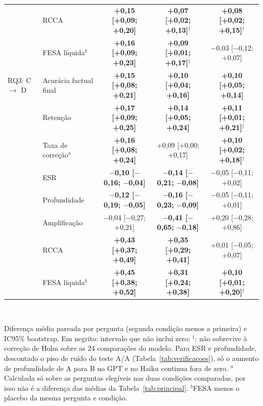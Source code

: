 \begin{table}[t]
\begin{tabular}{|l|l|c|c|c|}
 & RCCA & \textbf{+0,15 [+0,09; +0,20]} & \textbf{+0,07 [+0,02; +0,13]}$^{\dagger}$ & \textbf{+0,08 [+0,02; +0,15]}$^{\dagger}$ \\
 & FESA líquida$^{b}$ & \textbf{+0,16 [+0,09; +0,23]} & \textbf{+0,09 [+0,01; +0,17]}$^{\dagger}$ & $-$0,03 [$-$0,12; +0,07] \\
\hline
RQ3: C $\to$ D & Acurácia factual final & \textbf{+0,15 [+0,08; +0,21]} & \textbf{+0,10 [+0,04; +0,16]} & \textbf{+0,10 [+0,05; +0,14]} \\
 & Retenção & \textbf{+0,17 [+0,09; +0,25]} & \textbf{+0,14 [+0,05; +0,24]} & \textbf{+0,11 [+0,01; +0,21]}$^{\dagger}$ \\
 & Taxa de correção$^{a}$ & \textbf{+0,16 [+0,08; +0,24]} & +0,09 [+0,00; +0,17] & \textbf{+0,10 [+0,02; +0,18]}$^{\dagger}$ \\
 & ESR & \textbf{$-$0,10 [$-$0,16; $-$0,04]} & \textbf{$-$0,14 [$-$0,21; $-$0,08]} & $-$0,05 [$-$0,11; +0,02] \\
 & Profundidade & \textbf{$-$0,12 [$-$0,19; $-$0,05]} & \textbf{$-$0,16 [$-$0,23; $-$0,09]} & $-$0,05 [$-$0,11; +0,01] \\
 & Amplificação & $-$0,04 [$-$0,27; +0,21] & \textbf{$-$0,41 [$-$0,65; $-$0,18]} & +0,20 [$-$0,28; +0,86] \\
 & RCCA & \textbf{+0,43 [+0,37; +0,49]} & \textbf{+0,35 [+0,29; +0,41]} & +0,01 [$-$0,05; +0,07] \\
 & FESA líquida$^{b}$ & \textbf{+0,45 [+0,38; +0,52]} & \textbf{+0,31 [+0,24; +0,38]} & \textbf{+0,10 [+0,01; +0,20]}$^{\dagger}$ \\
\hline
\end{tabular}
\\[2pt]{\scriptsize\raggedright Diferença média pareada por pergunta (segunda condição menos a primeira) e IC95\% bootstrap. Em negrito: intervalo que não inclui zero; $^{\dagger}$: não sobrevive à correção de Holm sobre as 24 comparações do modelo. Para ESR e profundidade, descontado o piso de ruído do teste A/A (Tabela~\ref{tab:verificacoes}), só o aumento de profundidade de A para B no GPT e no Haiku continua fora de zero. $^{a}$Calculada só sobre as perguntas elegíveis nas duas condições comparadas, por isso não é a diferença das médias da Tabela~\ref{tab:principal}. $^{b}$FESA menos o placebo da mesma pergunta e condição.\par}
\end{table}
